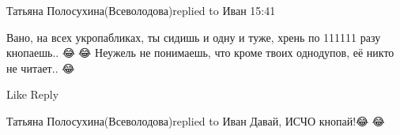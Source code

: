  
 
 
 
 

Татьяна Полосухина(Всеволодова)replied to Иван
15:41

Вано, на всех укропабликах, ты сидишь и одну и туже, хрень по 111111 разу
кнопаешь.. 😂🤣😂 Неужель не понимаешь, что кроме твоих однодупов, её никто не
читает.. 😂👏

    Like
    Reply

Татьяна Полосухина(Всеволодова)replied to Иван
Давай, ИСЧО кнопай!😂🤣😂👏👏
